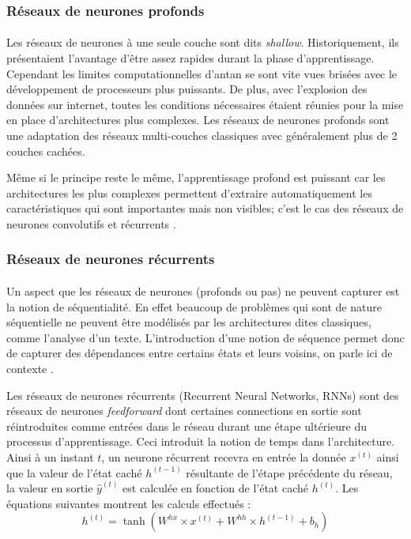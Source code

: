 \subsubsection{Réseaux de neurones profonds}\label{part2DNN}
\paragraph{}
Les réseaux de neurones à une seule couche sont dits \textit{shallow}. Historiquement, ils présentaient l'avantage d'être assez rapides durant la phase d'apprentissage. Cependant les limites computationnelles d'antan se sont vite vues brisées avec le développement de processeurs plus puissants. De plus, avec l'explosion des données sur internet, toutes les conditions nécessaires étaient réunies pour la mise en place d'architectures plus complexes. Les réseaux de neurones profonds sont une adaptation des réseaux multi-couches classiques avec généralement plus de 2 couches cachées. 
\par 
Même si le principe reste le même, l'apprentissage profond est puissant car les architectures les plus complexes permettent d'extraire automatiquement les caractéristiques qui sont importantes mais non visibles; c'est le cas des réseaux de neurones convolutifs et récurrents \citep{dnn}.

\subsubsection{Réseaux de neurones récurrents}\label{seq2seqpart2}
\paragraph{}
Un aspect que les réseaux de neurones (profonds ou pas) ne peuvent capturer est la notion de séquentialité. En effet beaucoup de problèmes qui sont de nature séquentielle ne peuvent être modélisés par les architectures dites classiques, comme l'analyse d'un texte. L'introduction d'une notion de séquence permet donc de capturer des dépendances entre certains états et leurs voisins, on parle ici de contexte \citep{rnn_lstms}.
\par 
Les réseaux de neurones récurrents (Recurrent Neural Networks, RNNs) sont des réseaux de neurones \textit{feedforward} dont certaines connections en sortie sont réintroduites comme entrées dans le réseau durant une étape ultérieure du processus d'apprentissage. Ceci introduit la notion de temps dans l'architecture. Ainsi à un instant $t$, un neurone récurrent recevra en entrée la donnée $x^{(t)}$ ainsi que la valeur de l'état caché $h^{(t-1)}$ résultante de l'étape précédente du réseau, la valeur en sortie $\hat{y}^{(t)}$ est calculée en fonction de l'état caché $h^{(t)}$. Les équations suivantes montrent les calculs effectués \citep{rnn_lstms} :
\begin{equation}
h^{(t)} = \tanh(W^{hx} \times x^{(t)} + W^{hh} \times h^{(t-1)} + b_h)
\end{equation}

